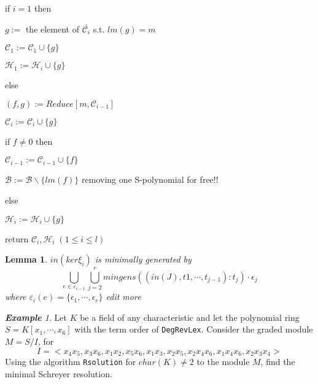 \documentclass{article}
\newtheorem{lemma}[theorem]{Lemma}
\theoremstyle{definition}
\theoremstyle{remark}
\theoremstyle{example}
\newtheorem{example}{\textbf{Example}}[section]
\begin{document}
if $i = 1$ then

$g :=$  the element of $\bar{{\mathcal{C}}_i}$ s.t. $lm(g) = m$

${\mathcal{C}}_1 := {\mathcal{C}}_1 \cup \{g\}$

${\mathcal{H}}_1 := {\mathcal{H}}_i \cup \{g\}$

else

$(f,g) := Reduce[m,{\mathcal{C}}_{i-1}]$

${\mathcal{C}}_i := {\mathcal{C}}_i \cup \{g\}$

if $f \neq 0$ then 

${\mathcal{C}}_{i-1} := {\mathcal{C}}_{i-1} \cup \{f\}$

$\mathcal{B} := \mathcal{B} \backslash \{lm(f)\}$  removing one S-polynomial for free!!

else

${\mathcal{H}}_i := {\mathcal{H}}_i \cup \{g\}$

return ${\mathcal{C}}_i, {\mathcal{H}}_i \; (1\leq i \leq l)$

\begin{lemma}\label{lem:mingens}
    $in(ker\xi_i)$ is minimally generated by
    \begin{equation}
        \bigcup_{e\in{\varepsilon}_{i-1}}{\bigcup_{j = 2}^{r}{mingens((in(J),t1,\cdots,t_{j-1}):t_j)\cdot \epsilon_j}}
    \end{equation}
    where $\varepsilon_i(e) = \{\epsilon_1,\cdots,\epsilon_r\}$
    \textcolor{BrickRed}{edit more}
\end{lemma}

\begin{example}
    Let $K$ be a field of any characteristic and let the polynomial ring $S = K[x_1,\cdots,x_6]$ with the term order of \verb+DegRevLex+. Consider the graded module $M = S/I$, for 
    \begin{equation}
        I = <x_4x_5,x_3x_6,x_1x_2,x_5x_6,x_1x_3,x_2x_5,x_2x_4x_6,x_1x_4x_6,x_2x_3x_4>
    \end{equation} 
    Using the algorithm \verb+Rsolution+ for $char(K) \neq 2$ to the module $M$, find the minimal Schreyer resolution.
\end{example}

\paragraph{  }
\end{document}
